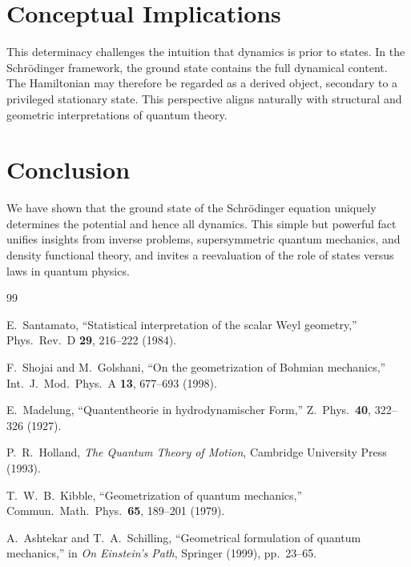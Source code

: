 \documentclass[11pt]{article}
\begin{document}
\section{Conceptual Implications}
This determinacy challenges the intuition that dynamics is prior to states. In the Schr\"odinger framework, the ground state contains the full dynamical content. The Hamiltonian may therefore be regarded as a derived object, secondary to a privileged stationary state. This perspective aligns naturally with structural and geometric interpretations of quantum theory.

\section{Conclusion}
We have shown that the ground state of the Schr\"odinger equation uniquely determines the potential and hence all dynamics. This simple but powerful fact unifies insights from inverse problems, supersymmetric quantum mechanics, and density functional theory, and invites a reevaluation of the role of states versus laws in quantum physics.


\begin{thebibliography}{99}

E.~Santamato,
``Statistical interpretation of the scalar Weyl geometry,''
Phys.\ Rev.\ D \textbf{29}, 216--222 (1984).

F.~Shojai and M.~Golshani,
``On the geometrization of Bohmian mechanics,''
Int.\ J.\ Mod.\ Phys.\ A \textbf{13}, 677--693 (1998).

E.~Madelung,
``Quantentheorie in hydrodynamischer Form,''
Z.\ Phys.\ \textbf{40}, 322--326 (1927).

P.~R.~Holland,
\emph{The Quantum Theory of Motion},
Cambridge University Press (1993).

T.~W.~B.~Kibble,
``Geometrization of quantum mechanics,''
Commun.\ Math.\ Phys.\ \textbf{65}, 189--201 (1979).

A.~Ashtekar and T.~A.~Schilling,
``Geometrical formulation of quantum mechanics,''
in \emph{On Einstein’s Path},
Springer (1999), pp.~23--65.

\end{thebibliography}
\end{document}
